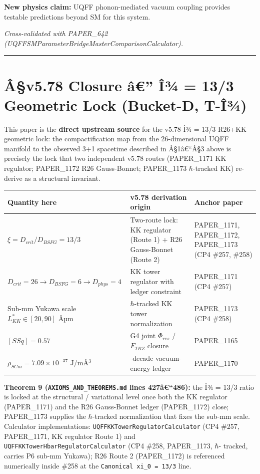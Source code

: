 \documentclass[12pt,a4paper]{article}
\begin{document}
\textbf{New physics claim:} UQFF phonon-mediated vacuum coupling provides testable predictions beyond SM for this system.

\emph{Cross-validated with PAPER\_642 (UQFFSMParameterBridgeMasterComparisonCalculator).}

\medskip\hrule\medskip

\section{Â\S{}v5.78 Closure â€'' Î¾ = 13/3 Geometric Lock (Bucket-D, T-Î¾)}

This paper is the \textbf{direct upstream source} for the v5.78 Î¾ = 13/3 R26+KK geometric lock: the compactification map from the 26-dimensional UQFF manifold to the observed 3+1 spacetime described in Â\S{}1â€``Â\S{}3 above is precisely the lock that two independent v5.78 routes (PAPER\_1171 KK regulator; PAPER\_1172 R26 Gauss-Bonnet; PAPER\_1173 $\hbar$-tracked KK) re-derive as a structural invariant.

\begin{table}[H]
\centering
\small
\begin{tabularx}{\linewidth}{@{}>{\raggedright\arraybackslash}X>{\raggedright\arraybackslash}X>{\raggedright\arraybackslash}X@{}}
\toprule
Quantity here & v5.78 derivation origin & Anchor paper \tabularnewline
\midrule
$\xi = D_{crit}/D_{BSFG} = 13/3$ & Two-route lock: KK regulator (Route 1) + R26 Gauss-Bonnet (Route 2) & PAPER\_1171, PAPER\_1172, PAPER\_1173 (CP4 \#257, \#258) \tabularnewline
$D_{crit} = 26 \to D_{BSFG} = 6 \to D_{phys} = 4$ & KK tower regulator with ledger constraint & PAPER\_1171 (CP4 \#257) \tabularnewline
Sub-mm Yukawa scale $L_{KK}^{*} \in [20, 90]$ Âµm & $\hbar$-tracked KK tower normalization & PAPER\_1173 (CP4 \#258) \tabularnewline
$[SSq] = 0.57$ & G4 joint $\Phi_{res}$ / $F_{TRZ}$ closure & PAPER\_1165 \tabularnewline
$\rho_{SCm} = 7.09\times10^{-37}$ J/mÂ$^{3}$ & 27-decade vacuum-energy ledger & PAPER\_1170 \tabularnewline
\bottomrule
\end{tabularx}
\end{table}

\textbf{Theorem 9 (\texttt{AXIOMS\_AND\_THEOREMS.md} lines 427â€``486):} the Î¾ = 13/3 ratio is locked at the structural / variational level once both the KK regulator (PAPER\_1171) and the R26 Gauss-Bonnet ledger (PAPER\_1172) close; PAPER\_1173 supplies the $\hbar$-tracked normalization that fixes the sub-mm scale. Calculator implementations: \texttt{UQFFKKTowerRegulatorCalculator} (CP4 \#257, PAPER\_1171, KK regulator Route 1) and \texttt{UQFFKKTowerHbarRegulatorCalculator} (CP4 \#258, PAPER\_1173, $\hbar$- tracked, carries P6 sub-mm Yukawa); R26 Route 2 (PAPER\_1172) is referenced numerically inside \#258 at the \texttt{Canonical xi\_0 = 13/3} line.
\end{document}
